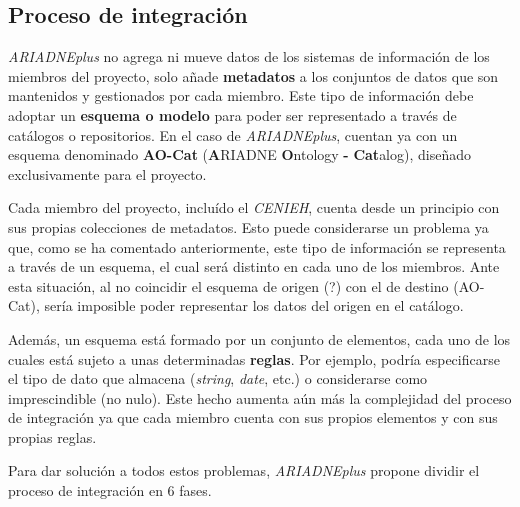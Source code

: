 \subsection{Proceso de integración}

\emph{ARIADNEplus} no agrega ni mueve datos de los sistemas de información de
los miembros del proyecto, solo añade \textbf{metadatos} a los conjuntos
de datos que son mantenidos y gestionados por cada miembro. Este tipo de 
información debe adoptar un \textbf{esquema o modelo} para poder ser
representado a través de catálogos o repositorios. En el caso de
\emph{ARIADNEplus}, cuentan ya con un esquema denominado \textbf{AO-Cat}
(\textbf{A}RIADNE \textbf{O}ntology \textbf{-} \textbf{Cat}alog),
diseñado exclusivamente para el proyecto.

Cada miembro del proyecto, incluído el \emph{CENIEH}, cuenta desde un principio
con sus propias colecciones de metadatos. Esto puede considerarse un
problema ya que, como se ha comentado anteriormente, este tipo de
información se representa a través de un esquema, el cual será distinto
en cada uno de los miembros. Ante esta situación, al no coincidir el
esquema de origen (?) con el de destino (AO-Cat), sería imposible poder
representar los datos del origen en el catálogo.


Además, un esquema está formado por un conjunto de elementos, cada uno
de los cuales está sujeto a unas determinadas \textbf{reglas}. Por ejemplo,
podría especificarse el tipo de dato que almacena (\emph{string},
\emph{date}, etc.) o considerarse como imprescindible (no nulo). Este
hecho aumenta aún más la complejidad del proceso de integración ya que
cada miembro cuenta con sus propios elementos y con sus propias reglas.

Para dar solución a todos estos problemas, \emph{ARIADNEplus} propone dividir
el proceso de integración en 6 fases.


